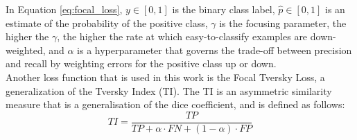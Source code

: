 \documentclass[12pt]{extarticle}
\begin{document}
\noindent
In Equation \eqref{eq:focal_loss}, $y \in [0, 1]$ is the binary class label, $\hat{p} \in [0, 1]$ is an estimate of the probability of the positive class, $\gamma$ is the focusing parameter, the higher the $\gamma$, the higher the rate at which easy-to-classify examples are down-weighted, and $\alpha$ is a hyperparameter that governs the trade-off between precision and recall by weighting errors for the positive class up or down. \\[4pt]
Another loss function that is used in this work is the Focal Tversky Loss, a generalization of the Tversky Index (TI). The TI is an asymmetric similarity measure that is a generalisation of the dice coefficient, and is defined as follows:
\begin{equation}
 TI = \dfrac{TP}{TP+\alpha \cdot FN + (1-\alpha)\cdot FP}
 \label{eq:tversky_index}
\end{equation}
\end{document}
